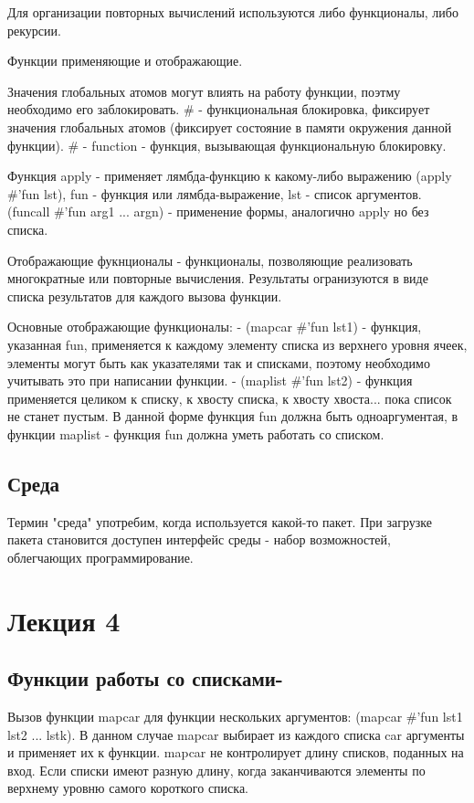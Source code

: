 Для организации повторных вычислений используются либо функционалы, либо рекурсии.

Функции применяющие и отображающие.

Значения глобальных атомов могут влиять на работу функции, поэтму необходимо его заблокировать. \# - функциональная блокировка, фиксирует значения глобальных атомов (фиксирует состояние в памяти окружения данной функции). \# - function - функция, вызывающая функциональную блокировку.

Функция apply - применяет лямбда-функцию к какому-либо выражению (apply \#'fun lst), fun - функция или лямбда-выражение, lst - список аргументов.
(funcall \#'fun arg1 ... argn) - применение формы, аналогично apply но без списка.

Отображающие фукнционалы - функционалы, позволяющие реализовать многократные или повторные вычисления. Результаты огранизуются в виде списка результатов для каждого вызова функции. 

Основные отображающие функционалы:
- (mapcar \#'fun lst1) - функция, указанная fun, применяется к каждому элементу списка из верхнего уровня ячеек, элементы могут быть как указателями так и списками, поэтому необходимо учитывать это при написании функции.
- (maplist \#'fun lst2) - функция применяется целиком к списку, к хвосту списка, к хвосту хвоста... пока список не станет пустым.
В данной форме функция fun должна быть одноаргументая, в функции maplist - функция fun должна уметь работать со списком.

\section{Среда}
Термин "среда" употребим, когда используется какой-то пакет. При загрузке пакета становится доступен интерфейс среды - набор возможностей, облегчающих программирование.

\chapter{Лекция 4}
\section{Функции работы со списками-}
Вызов функции mapcar для функции нескольких аргументов: (mapcar \#'fun lst1 lst2 ... lstk). В данном случае mapcar выбирает из каждого списка car аргументы и применяет их к функции. mapcar не контролирует длину списков, поданных на вход. Если списки имеют разную длину, когда заканчиваются элементы по верхнему уровню самого короткого списка.


